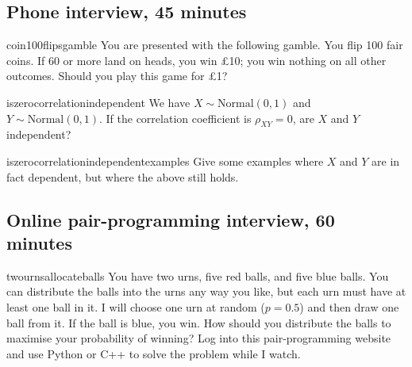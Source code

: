 \documentclass[a4paper]{article}
\begin{document}
\clearpage




\clearpage
\subsection{Phone interview, 45 minutes}
\begin{question}{coin100flipsgamble}
You are presented with the following gamble.
You flip 100 fair coins.
If 60 or more land on heads, you win \pounds 10; you win nothing on all other outcomes.
Should you play this game for \pounds 1?
\end{question}

\begin{question}{iszerocorrelationindependent}
We have $X \sim \text{Normal}(0,1)$ and $Y \sim \text{Normal}(0,1)$.
If the correlation coefficient is $\rho_{XY}=0$, are $X$ and $Y$ independent?
\end{question}


\begin{subquestion}{iszerocorrelationindependentexamples}
Give some examples where $X$ and $Y$ are in fact dependent, but where the above still holds.
\end{subquestion}

\clearpage





\clearpage
\subsection{Online pair-programming interview, 60 minutes}
\begin{question}{twournsallocateballs}
You have two urns, five red balls, and five blue balls.
You can distribute the balls into the urns any way you like, but each urn must have at least one ball in it.
I will choose one urn at random ($p=0.5$) and then draw one ball from it.
If the ball is blue, you win.
How should you distribute the balls to maximise your probability of winning?
Log into this pair-programming website and use Python or C++ to solve the problem while I watch.
\end{question}

\clearpage

\end{document}

